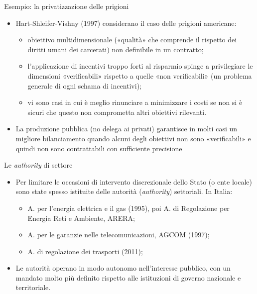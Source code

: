 \documentclass[aspectratio=64,12pt]{beamer}
\begin{document}
\begin{frame}{Esempio: la privatizzazione delle prigioni}
\begin{itemize}
\item Hart-Shleifer-Vishny (1997) considerano il caso delle prigioni americane:
\begin{itemize}
\item obiettivo multidimensionale («qualità» che comprende il rispetto dei
diritti umani dei carcerati) non definibile in un contratto;
\item l'applicazione di incentivi troppo forti al risparmio spinge a
privilegiare le dimensioni «verificabili» rispetto a quelle «non
verificabili» (un problema generale di ogni schama di incentivi);
\item vi sono casi in cui è meglio rinunciare a minimizzare i costi se non si è
sicuri che questo non comprometta altri obiettivi rilevanti.
\end{itemize}
\item La produzione pubblica (no delega ai privati) garantisce in molti casi un
migliore bilanciamento quando alcuni degli obiettivi non sono «verificabili»
e quindi non sono contrattabili con sufficiente precisione
\end{itemize}
\end{frame}

\begin{frame}{Le \emph{authority} di settore}

\begin{itemize}
\item Per limitare le occasioni di intervento discrezionale dello Stato
  (o ente locale) sono state spesso istituite delle autorità
  (\emph{authority}) settoriali. In Italia:
\begin{itemize}
\item A. per l'energia elettrica e il gas (1995), poi A. di Regolazione
  per Energia Reti e Ambiente, ARERA;
\item A. per le garanzie nelle telecomunicazioni, AGCOM (1997);
\item A. di regolazione dei trasporti (2011);
\end{itemize}
\item Le autorità operano in modo autonomo nell'interesse pubblico, con un
  mandato molto più definito rispetto alle istituzioni di governo nazionale e
  territoriale.
\end{itemize}
\end{frame}
\end{document}
